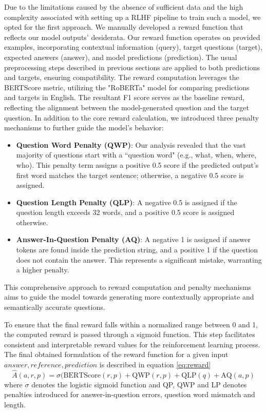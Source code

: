 \documentclass{article}
\begin{document}
Due to the limitations caused by the absence of sufficient data and the high complexity associated with setting up a RLHF pipeline to train such a model, we opted for the first approach. We manually developed a reward function that reflects our model outputs' desiderata. Our reward function operates on provided examples, incorporating contextual information (query), target questions (target), expected answers (answer), and model predictions (prediction). The usual preprocessing steps described in previous sections are applied to both predictions and targets, ensuring compatibility.
The reward computation leverages the BERTScore \cite{bertscore} metric, utilizing the "RoBERTa" \cite{devlin2019bert} model for comparing predictions and targets in English. The resultant F1 score serves as the baseline reward, reflecting the alignment between the model-generated question and the target question.
In addition to the core reward calculation, we introduced three penalty mechanisms to further guide the model's behavior:
\begin{itemize}
    \item \textbf{Question Word Penalty (QWP)}: Our analysis revealed that the vast majority of questions start with a ``question word" (e.g., what, when, where, who). This penalty term assigns a positive 0.5 score if the predicted output's first word matches the target sentence; otherwise, a negative 0.5 score is assigned.
    \item \textbf{Question Length Penalty (QLP)}: A negative 0.5 is assigned if the question length exceeds 32 words, and a positive 0.5 score is assigned otherwise.
    \item \textbf{Answer-In-Question Penalty (AQ)}: A negative 1 is assigned if answer tokens are found inside the prediction string, and a positive 1 if the question does not contain the answer. This represents a significant mistake, warranting a higher penalty.
\end{itemize} 
This comprehensive approach to reward computation and penalty mechanisms aims to guide the model towards generating more contextually appropriate and semantically accurate questions.

To ensure that the final reward falls within a normalized range between 0 and 1, the computed reward is passed through a sigmoid function. This step facilitates consistent and interpretable reward values for the reinforcement learning process.
The final obtained formulation of the reward function for a given input $answer, reference, prediction$ is described in equation \ref{eq:reward}
\begin{equation}
    \hat{A}(a, r, p) = \sigma(\text{BERTScore}(r, p) + \text{QWP}(r,p) + \text{QLP}(q) + \text{AQ}(a, p)
    \label{eq:reward}
\end{equation}
where $\sigma$ denotes the logistic sigmoid function and QP, QWP and LP denotes penalties introduced for answer-in-question errors, question word mismatch and length.
\end{document}
